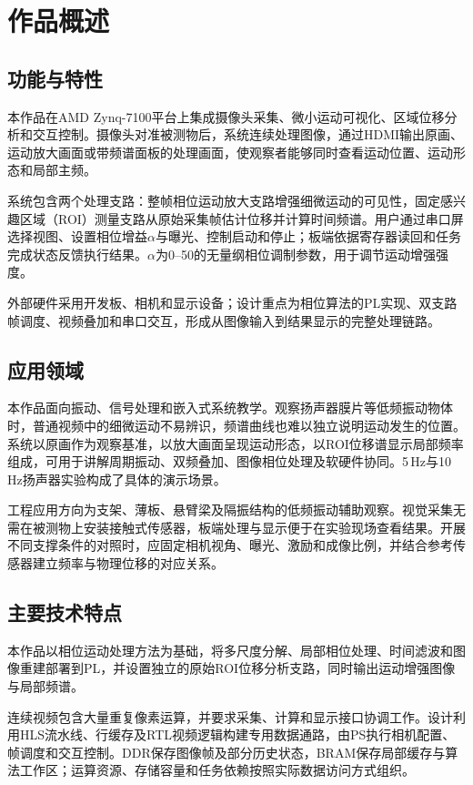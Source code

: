 \documentclass[UTF8,a4paper,zihao=-4,fontset=none]{ctexart}
\numberwithin{figure}{section}
\numberwithin{table}{section}
\begin{document}
\section{作品概述}
\label{sec:overview}

\subsection{功能与特性}
本作品在AMD Zynq-7100平台上集成摄像头采集、微小运动可视化、区域位移分析和交互控制。摄像头对准被测物后，系统连续处理图像，通过HDMI输出原画、运动放大画面或带频谱面板的处理画面，使观察者能够同时查看运动位置、运动形态和局部主频。

系统包含两个处理支路：整帧相位运动放大支路增强细微运动的可见性，固定感兴趣区域（ROI）测量支路从原始采集帧估计位移并计算时间频谱。用户通过串口屏选择视图、设置相位增益$\alpha$与曝光、控制启动和停止；板端依据寄存器读回和任务完成状态反馈执行结果。$\alpha$为0--50的无量纲相位调制参数，用于调节运动增强强度。

外部硬件采用开发板、相机和显示设备；设计重点为相位算法的PL实现、双支路帧调度、视频叠加和串口交互，形成从图像输入到结果显示的完整处理链路。

\subsection{应用领域}
本作品面向振动、信号处理和嵌入式系统教学。观察扬声器膜片等低频振动物体时，普通视频中的细微运动不易辨识，频谱曲线也难以独立说明运动发生的位置。系统以原画作为观察基准，以放大画面呈现运动形态，以ROI位移谱显示局部频率组成，可用于讲解周期振动、双频叠加、图像相位处理及软硬件协同。5\,Hz与10\,Hz扬声器实验构成了具体的演示场景。

工程应用方向为支架、薄板、悬臂梁及隔振结构的低频振动辅助观察。视觉采集无需在被测物上安装接触式传感器，板端处理与显示便于在实验现场查看结果。开展不同支撑条件的对照时，应固定相机视角、曝光、激励和成像比例，并结合参考传感器建立频率与物理位移的对应关系。

\subsection{主要技术特点}
本作品以相位运动处理方法\cite{wadhwa2013}为基础，将多尺度分解、局部相位处理、时间滤波和图像重建部署到PL，并设置独立的原始ROI位移分析支路，同时输出运动增强图像与局部频谱。

连续视频包含大量重复像素运算，并要求采集、计算和显示接口协调工作。设计利用HLS流水线、行缓存及RTL视频逻辑构建专用数据通路，由PS执行相机配置、帧调度和交互控制。DDR保存图像帧及部分历史状态，BRAM保存局部缓存与算法工作区；运算资源、存储容量和任务依赖按照实际数据访问方式组织。
\end{document}
